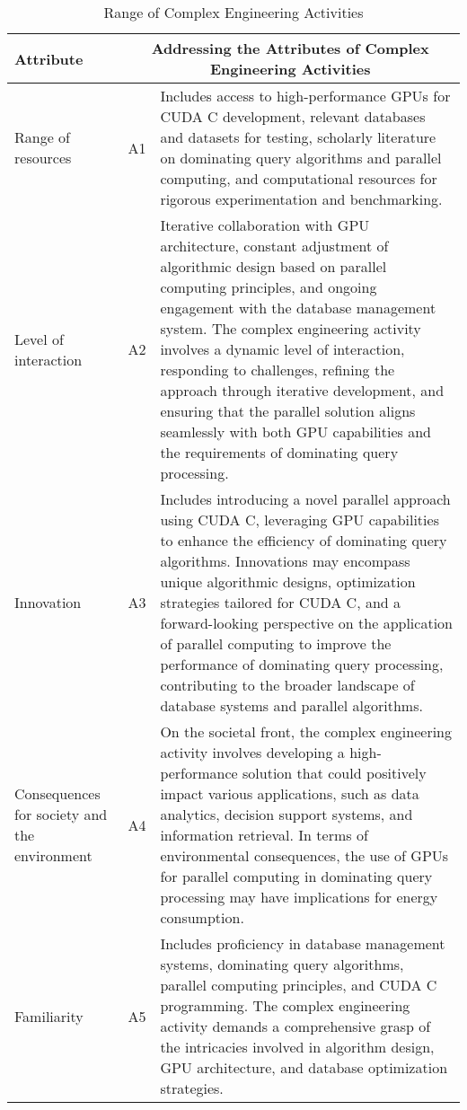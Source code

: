 \begin{longtable}{|m{5cm}|m{1cm}|m{8cm}|}
\caption{Range of Complex Engineering Activities}
\label{Complex Engineering Activities}

\hline
Attribute & \multicolumn{2}{|c|}{Addressing the Attributes of Complex Engineering Activities }\\
\hline
Range of resources & A1 & Includes access to high-performance GPUs for CUDA C development, relevant databases and datasets for testing, scholarly literature on dominating query algorithms and parallel computing, and
computational resources for rigorous experimentation and benchmarking. \\
\hline
Level of interaction & A2 & Iterative collaboration with GPU architecture, constant adjustment of algorithmic design based on parallel computing principles, and ongoing engagement with the database management
system. The complex engineering activity involves a dynamic
level of interaction, responding to challenges, refining the approach through iterative development, and ensuring that the parallel solution aligns seamlessly with both GPU capabilities and
the requirements of dominating query processing.\\
\hline
Innovation & A3 & Includes introducing a novel parallel approach using CUDA C,
leveraging GPU capabilities to enhance the efficiency of dominating query algorithms. Innovations may encompass unique algorithmic designs, optimization strategies tailored for CUDA C,
and a forward-looking perspective on the application of parallel
computing to improve the performance of dominating query processing, contributing to the broader landscape of database systems and parallel algorithms. \\
\hline
Consequences for society and the environment & A4 & On the societal front, the complex engineering activity involves
developing a high-performance solution that could positively impact various applications, such as data analytics, decision support
systems, and information retrieval. In terms of environmental
consequences, the use of GPUs for parallel computing in dominating query processing may have implications for energy consumption. \\
\hline
Familiarity & A5 & Includes proficiency in database management systems, dominating query algorithms, parallel computing principles, and CUDA
C programming. The complex engineering activity demands a
comprehensive grasp of the intricacies involved in algorithm design, GPU architecture, and database optimization strategies. \\
\hline
\end{longtable}